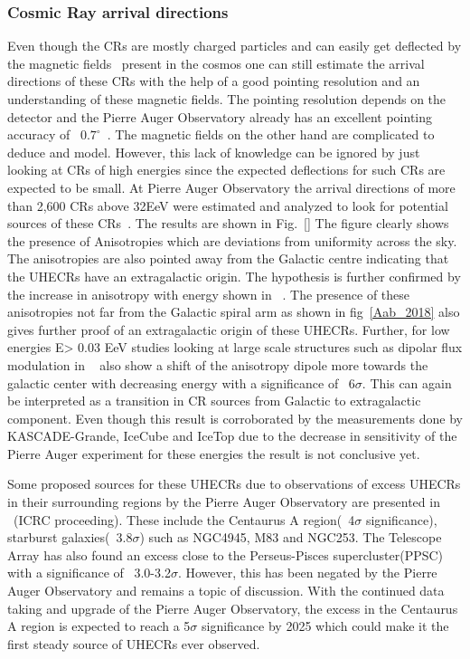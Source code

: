 \subsubsection*{Cosmic Ray arrival directions}
\label{subsubsec:CRdirec}
Even though the CRs are mostly charged particles and can easily get deflected by the magnetic fields~\cite{Ar_mburo_Garc_a_2021} present in the cosmos one can still estimate the arrival directions of these CRs with the help of a good pointing resolution and an understanding of these magnetic fields. The pointing resolution depends on the detector and the Pierre Auger Observatory already has an excellent pointing accuracy of ~$0.7^{\circ}$~\cite{BONIFAZI200920}. The magnetic fields on the other hand are complicated to deduce and model. However, this lack of knowledge can be ignored by just looking at CRs of high energies since the expected deflections for such CRs are expected to be small. At Pierre Auger Observatory the arrival directions of more than 2,600 CRs above 32EeV were estimated and analyzed to look for potential sources of these CRs~\cite{Abreu_2022}. The results are shown in Fig.~\ref{} The figure clearly shows the presence of Anisotropies which are deviations from uniformity across the sky. The anisotropies are also pointed away from the Galactic centre indicating that the UHECRs have an extragalactic origin. The hypothesis is further confirmed by the increase in anisotropy with energy shown in ~\cite{}. The presence of these anisotropies not far from the Galactic spiral arm as shown in fig~\ref{Aab_2018} also gives further proof of an extragalactic origin of these UHECRs. Further, for low energies E> 0.03 EeV studies looking at large scale structures such as dipolar flux modulation in ~\cite{Aab_2020_dipole_modulation} also show a shift of the anisotropy dipole more towards the galactic center with decreasing energy with a significance of ~6$\sigma$. This can again be interpreted as a transition in CR sources from Galactic to extragalactic component. Even though this result is corroborated by the measurements done by KASCADE-Grande, IceCube and IceTop due to the decrease in sensitivity of the Pierre Auger experiment for these energies the result is not conclusive yet.

Some proposed sources for these UHECRs due to observations of excess UHECRs in their surrounding regions by the Pierre Auger Observatory are presented in ~\cite{TelescopeArray:2021gxg}(ICRC proceeding). These include the Centaurus A region(~4$\sigma$ significance), starburst galaxies(~3.8$\sigma$) such as NGC4945, M83 and NGC253. The Telescope Array has also found an excess close to the Perseus-Pisces supercluster(PPSC) with a significance of ~3.0-3.2$\sigma$. However, this has been negated by the Pierre Auger Observatory and remains a topic of discussion. With the continued data taking and upgrade of the Pierre Auger Observatory, the excess in the Centaurus A region is expected to reach a 5$\sigma$ significance by 2025 which could make it the first steady source of UHECRs ever observed. 
 

